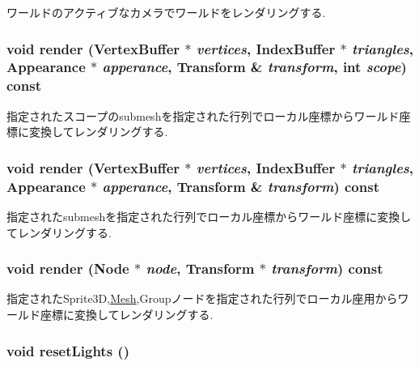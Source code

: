 ワールドのアクティブなカメラでワールドをレンダリングする. \hypertarget{classm3g_1_1Graphics3D_9179d0d886a57cd3234b34f1b59dfc3c}{
\subsubsection[{render}]{\setlength{\rightskip}{0pt plus 5cm}void render ({\bf VertexBuffer} $\ast$ {\em vertices}, \/  {\bf IndexBuffer} $\ast$ {\em triangles}, \/  {\bf Appearance} $\ast$ {\em apperance}, \/  {\bf Transform} \& {\em transform}, \/  int {\em scope}) const}}
\label{classm3g_1_1Graphics3D_9179d0d886a57cd3234b34f1b59dfc3c}


指定されたスコープのsubmeshを指定された行列でローカル座標からワールド座標に変換してレンダリングする. \hypertarget{classm3g_1_1Graphics3D_dc32291b31d6d3a32037eb9f727f73c0}{
\subsubsection[{render}]{\setlength{\rightskip}{0pt plus 5cm}void render ({\bf VertexBuffer} $\ast$ {\em vertices}, \/  {\bf IndexBuffer} $\ast$ {\em triangles}, \/  {\bf Appearance} $\ast$ {\em apperance}, \/  {\bf Transform} \& {\em transform}) const}}
\label{classm3g_1_1Graphics3D_dc32291b31d6d3a32037eb9f727f73c0}


指定されたsubmeshを指定された行列でローカル座標からワールド座標に変換してレンダリングする. \hypertarget{classm3g_1_1Graphics3D_9c9ca78b3ce4cc358783a1a2701b9d85}{
\subsubsection[{render}]{\setlength{\rightskip}{0pt plus 5cm}void render ({\bf Node} $\ast$ {\em node}, \/  {\bf Transform} $\ast$ {\em transform}) const}}
\label{classm3g_1_1Graphics3D_9c9ca78b3ce4cc358783a1a2701b9d85}


指定されたSprite3D,\hyperlink{classm3g_1_1Mesh}{Mesh},Groupノードを指定された行列でローカル座用からワールド座標に変換してレンダリングする. \hypertarget{classm3g_1_1Graphics3D_b8821ec231e8ebd939ae0feaaf138542}{
\subsubsection[{resetLights}]{\setlength{\rightskip}{0pt plus 5cm}void resetLights ()}}
\label{classm3g_1_1Graphics3D_b8821ec231e8ebd939ae0feaaf138542}


